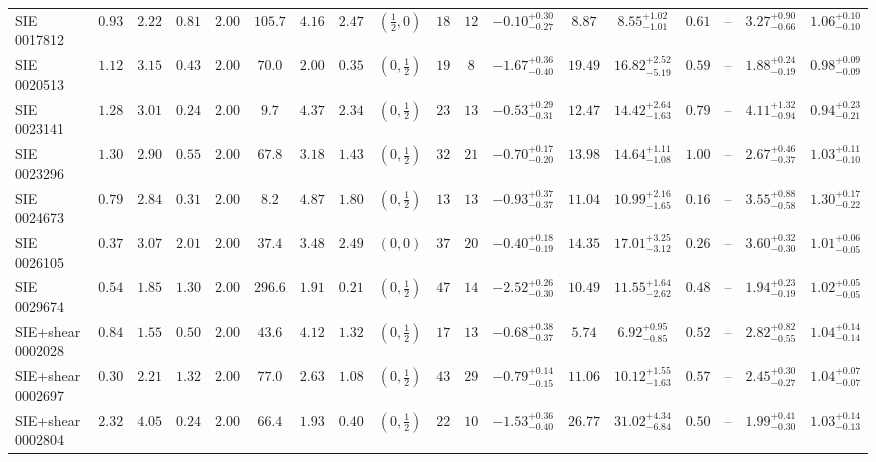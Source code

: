 \begin{longtable}{@{}lccccccccccccccccc@{}}
SIE 0017812 & $0.93$ & $2.22$ & $0.81$ & $2.00$ & $105.7$ & $4.16$ & $2.47$ & $(\frac12,0)$ & $18$ & $12$ & $-0.10^{+0.30}_{-0.27}$ & $8.87$ & $8.55^{+1.02}_{-1.01}$ & $0.61$ & -- & $3.27^{+0.90}_{-0.66}$ & $1.06^{+0.10}_{-0.10}$\\
SIE 0020513 & $1.12$ & $3.15$ & $0.43$ & $2.00$ & $70.0$ & $2.00$ & $0.35$ & $(0,\frac12)$ & $19$ & $8$ & $-1.67^{+0.36}_{-0.40}$ & $19.49$ & $16.82^{+2.52}_{-5.19}$ & $0.59$ & -- & $1.88^{+0.24}_{-0.19}$ & $0.98^{+0.09}_{-0.09}$\\
SIE 0023141 & $1.28$ & $3.01$ & $0.24$ & $2.00$ & $9.7$ & $4.37$ & $2.34$ & $(0,\frac12)$ & $23$ & $13$ & $-0.53^{+0.29}_{-0.31}$ & $12.47$ & $14.42^{+2.64}_{-1.63}$ & $0.79$ & -- & $4.11^{+1.32}_{-0.94}$ & $0.94^{+0.23}_{-0.21}$\\
SIE 0023296 & $1.30$ & $2.90$ & $0.55$ & $2.00$ & $67.8$ & $3.18$ & $1.43$ & $(0,\frac12)$ & $32$ & $21$ & $-0.70^{+0.17}_{-0.20}$ & $13.98$ & $14.64^{+1.11}_{-1.08}$ & $1.00$ & -- & $2.67^{+0.46}_{-0.37}$ & $1.03^{+0.11}_{-0.10}$\\
SIE 0024673 & $0.79$ & $2.84$ & $0.31$ & $2.00$ & $8.2$ & $4.87$ & $1.80$ & $(0,\frac12)$ & $13$ & $13$ & $-0.93^{+0.37}_{-0.37}$ & $11.04$ & $10.99^{+2.16}_{-1.65}$ & $0.16$ & -- & $3.55^{+0.88}_{-0.58}$ & $1.30^{+0.17}_{-0.22}$\\
SIE 0026105 & $0.37$ & $3.07$ & $2.01$ & $2.00$ & $37.4$ & $3.48$ & $2.49$ & $(0,0)$ & $37$ & $20$ & $-0.40^{+0.18}_{-0.19}$ & $14.35$ & $17.01^{+3.25}_{-3.12}$ & $0.26$ & -- & $3.60^{+0.32}_{-0.30}$ & $1.01^{+0.06}_{-0.05}$\\
SIE 0029674 & $0.54$ & $1.85$ & $1.30$ & $2.00$ & $296.6$ & $1.91$ & $0.21$ & $(0,\frac12)$ & $47$ & $14$ & $-2.52^{+0.26}_{-0.30}$ & $10.49$ & $11.55^{+1.64}_{-2.62}$ & $0.48$ & -- & $1.94^{+0.23}_{-0.19}$ & $1.02^{+0.05}_{-0.05}$\\
SIE+shear 0002028 & $0.84$ & $1.55$ & $0.50$ & $2.00$ & $43.6$ & $4.12$ & $1.32$ & $(0,\frac12)$ & $17$ & $13$ & $-0.68^{+0.38}_{-0.37}$ & $5.74$ & $6.92^{+0.95}_{-0.85}$ & $0.52$ & -- & $2.82^{+0.82}_{-0.55}$ & $1.04^{+0.14}_{-0.14}$\\
SIE+shear 0002697 & $0.30$ & $2.21$ & $1.32$ & $2.00$ & $77.0$ & $2.63$ & $1.08$ & $(0,\frac12)$ & $43$ & $29$ & $-0.79^{+0.14}_{-0.15}$ & $11.06$ & $10.12^{+1.55}_{-1.63}$ & $0.57$ & -- & $2.45^{+0.30}_{-0.27}$ & $1.04^{+0.07}_{-0.07}$\\
SIE+shear 0002804 & $2.32$ & $4.05$ & $0.24$ & $2.00$ & $66.4$ & $1.93$ & $0.40$ & $(0,\frac12)$ & $22$ & $10$ & $-1.53^{+0.36}_{-0.40}$ & $26.77$ & $31.02^{+4.34}_{-6.84}$ & $0.50$ & -- & $1.99^{+0.41}_{-0.30}$ & $1.03^{+0.14}_{-0.13}$\\

\end{longtable}
